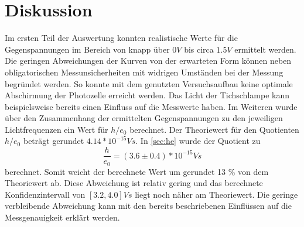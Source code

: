 \section{Diskussion}
\label{sec:Diskussion}

Im ersten Teil der Auswertung konnten realistische Werte für die Gegenspannungen im Bereich von knapp über $0V$ bis circa $1.5V$ ermittelt werden. Die geringen Abweichungen der Kurven von der erwarteten Form können neben obligatorischen Messunsicherheiten mit widrigen Umständen bei der Messung begründet werden. So konnte mit dem genutzten Versuchsaufbau keine optimale Abschirmung der Photozelle erreicht werden. Das Licht der Tichschlampe kann beispielsweise bereits einen Einfluss auf die Messwerte haben. 
\newline
Im Weiteren wurde über den Zusammenhang der ermittelten Gegenspannungen zu den jeweiligen Lichtfrequenzen ein Wert für $h/e_0$ berechnet. Der Theoriewert für den Quotienten $h/e_0$ beträgt gerundet $4.14*10^{-15} Vs$. In \autoref{sec:he} wurde der Quotient zu 
\begin{equation*}
    \frac{h}{e_0}=(3.6\pm0.4)*10^{-15} Vs
\end{equation*}
berechnet. Somit weicht der berechnete Wert um gerundet 13 \% von dem Theoriewert ab. Diese Abweichung ist relativ gering und das berechnete Konfidenzintervall von $[3.2 , 4.0]Vs$ liegt noch näher am Theoriewert. Die geringe verbleibende Abweichung kann mit den bereits beschriebenen Einflüssen auf die Messgenauigkeit erklärt werden. 